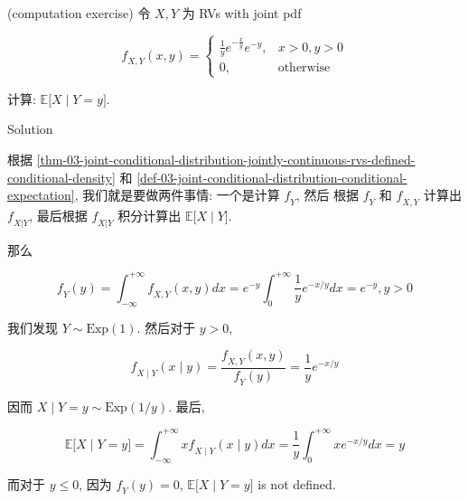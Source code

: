 \begin{example}

(computation exercise) 令 \(\mathit{X},\mathit{Y}\) 为 RVs with joint pdf

\[\mathit{f}_{\mathit{X},\mathit{Y}}(\mathit{x},\mathit{y}) = \left\{ \begin{matrix}
{\frac{1}{\mathit{y}}\mathit{e}^{- \frac{\mathit{x}}{\mathit{y}}}\mathit{e}^{- \mathit{y}},} & {\mathit{x} > 0,\mathit{y} > 0} \\
{0,} & \text{otherwise}
\end{matrix} \right.\]

计算: \(\left. \mathbb{E}\lbrack\mathit{X} \middle| \mathit{Y} = \mathit{y}\rbrack \right.\).

\end{example}

\begin{qlsolution}{Solution}

根据 \ref{thm-03-joint-conditional-distribution-jointly-continuous-rvs-defined-conditional-density} 和 \ref{def-03-joint-conditional-distribution-conditional-expectation}, 我们就是要做两件事情: 一个是计算 \(\mathit{f}_{\mathit{Y}}\), 然后 根据 \(\mathit{f}_{\mathit{Y}}\) 和 \(\mathit{f}_{\mathit{X},\mathit{Y}}\) 计算出 \(\mathit{f}_{\mathit{X}|\mathit{Y}}\), 最后根据 \(\mathit{f}_{\mathit{X}|\mathit{Y}}\) 积分计算出 \(\left. \mathbb{E}\lbrack\mathit{X} \middle| \mathit{Y}\rbrack \right.\).

那么

\[\mathit{f}_{\mathit{Y}}(\mathit{y}) = \int_{- \infty}^{+ \infty}\mathit{f}_{\mathit{X},\mathit{Y}}(\mathit{x},\mathit{y})\mathit{d}\mathit{x} = \mathit{e}^{- \mathit{y}}\int_{0}^{+ \infty}\frac{1}{\mathit{y}}\mathit{e}^{- \mathit{x}/\mathit{y}}\mathit{d}\mathit{x} = \mathit{e}^{- \mathit{y}},\mathit{y} > 0\]

我们发现 \(\mathit{Y} \sim \text{Exp}(1)\). 然后对于 \(\mathit{y} > 0\),

\[\mathit{f}_{\mathit{X} \mid \mathit{Y}}(\mathit{x} \mid \mathit{y}) = \frac{\mathit{f}_{\mathit{X},\mathit{Y}}(\mathit{x},\mathit{y})}{\mathit{f}_{\mathit{Y}}(\mathit{y})} = \frac{1}{\mathit{y}}\mathit{e}^{- \mathit{x}/\mathit{y}}\]

因而 \(\left. \mathit{X} \middle| \mathit{Y} = \mathit{y} \sim \text{Exp}(1/\mathit{y}) \right.\). 最后,

\[\mathbb{E}\lbrack\mathit{X} \mid \mathit{Y} = \mathit{y}\rbrack = \int_{- \infty}^{+ \infty}\mathit{x}\mathit{f}_{\mathit{X} \mid \mathit{Y}}(\mathit{x} \mid \mathit{y})\mathit{d}\mathit{x} = \frac{1}{\mathit{y}}\int_{0}^{+ \infty}\mathit{x}\mathit{e}^{- \mathit{x}/\mathit{y}}\mathit{d}\mathit{x} = \mathit{y}\]

而对于 \(\mathit{y} \leq 0\), 因为 \(\mathit{f}_{\mathit{Y}}(\mathit{y}) = 0\), \(\mathbb{E}\lbrack\mathit{X} \mid \mathit{Y} = \mathit{y}\rbrack\) is not defined.

\end{qlsolution}

